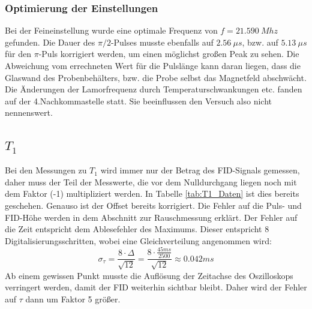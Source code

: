 \documentclass[12pt,a4paper]{article}
\begin{document}
\subsubsection{Optimierung der Einstellungen}
Bei der Feineinstellung wurde eine optimale Frequenz von  $f = \SI{21.590}{Mhz}$ gefunden. Die Dauer des $\pi / 2 $-Pulses musste ebenfalls auf $\SI{2.56}{\mu s}$, bzw. auf $\SI{5.13}{\mu s}$ für den $\pi$-Puls korrigiert werden, um einen möglichst großen Peak zu sehen. Die Abweichung vom errechneten Wert für die Pulslänge kann daran liegen, dass die Glaswand des Probenbehälters, bzw. die Probe selbst das Magnetfeld abschwächt.\\
Die Änderungen der Lamorfrequenz durch Temperaturschwankungen etc. fanden auf der 4.Nachkommastelle statt. Sie beeinflussen den Versuch also nicht nennenswert.

\subsection{$T_1$}
Bei den Messungen zu $T_1$ wird immer nur der Betrag des FID-Signals gemessen, daher muss der Teil der Messwerte, die vor dem Nulldurchgang liegen noch mit dem Faktor (-1) multipliziert werden. In Tabelle \ref{tab:T1_Daten} ist dies bereits geschehen. Genauso ist der Offset bereits korrigiert. Die Fehler auf die Puls- und FID-Höhe werden in dem Abschnitt zur Rauschmessung erklärt. Der Fehler auf die Zeit entspricht dem Ablesefehler des Maximums. Dieser entspricht 8 Digitalisierungsschritten, wobei eine Gleichverteilung angenommen wird:
\begin{equation*}
\sigma _{\tau} = \dfrac{8 \cdot \Delta}{\sqrt{12}} = \dfrac{8 \cdot \frac{45 ms}{2500}}{\sqrt{12}} \approx 0.042 ms
\end{equation*}
Ab einem gewissen Punkt musste die Auflösung der Zeitachse des Oszilloskops verringert werden, damit der FID weiterhin sichtbar bleibt. Daher wird der Fehler auf $\tau$ dann um Faktor 5 größer.
\end{document}
